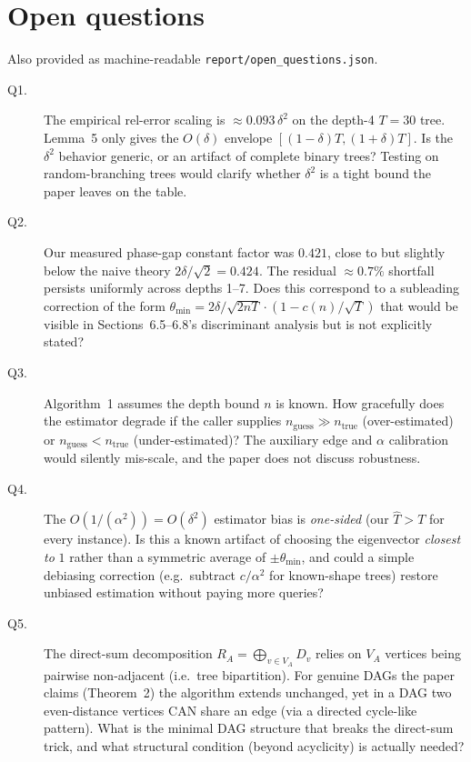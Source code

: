 \documentclass[11pt]{article}
\begin{document}
\section*{Open questions}
Also provided as machine-readable \verb|report/open_questions.json|.

\begin{description}
\item[Q1.] The empirical rel-error scaling is $\approx 0.093\,\delta^2$ on
      the depth-4 $T{=}30$ tree.  Lemma~5 only gives the $O(\delta)$ envelope
      $[(1-\delta)T, (1+\delta)T]$.  Is the $\delta^2$ behavior generic, or
      an artifact of complete binary trees?  Testing on
      random-branching trees would clarify whether $\delta^2$ is a tight bound
      the paper leaves on the table.
\item[Q2.] Our measured phase-gap constant factor was $0.421$, close to but
      slightly below the naive theory $2\delta/\sqrt{2} = 0.424$.  The
      residual $\approx 0.7\%$ shortfall persists uniformly across depths
      1--7.  Does this correspond to a subleading correction of the form
      $\theta_{\min} = 2\delta/\sqrt{2nT} \cdot (1 - c(n)/\sqrt{T})$ that
      would be visible in Sections~6.5--6.8's discriminant analysis but is
      not explicitly stated?
\item[Q3.] Algorithm~1 assumes the depth bound $n$ is known.  How gracefully
      does the estimator degrade if the caller supplies $n_{\text{guess}} \gg
      n_{\text{true}}$ (over-estimated) or $n_{\text{guess}} <
      n_{\text{true}}$ (under-estimated)?  The auxiliary edge and $\alpha$
      calibration would silently mis-scale, and the paper does not discuss
      robustness.
\item[Q4.] The $O(1/(\alpha^2)) = O(\delta^2)$ estimator bias is
      \emph{one-sided} (our $\hat T > T$ for every instance).  Is this a
      known artifact of choosing the eigenvector \emph{closest to} $1$
      rather than a symmetric average of $\pm\theta_{\min}$, and could a
      simple debiasing correction (e.g.\ subtract $c/\alpha^2$ for
      known-shape trees) restore unbiased estimation without paying more
      queries?
\item[Q5.] The direct-sum decomposition $R_A = \bigoplus_{v \in V_A} D_v$
      relies on $V_A$ vertices being pairwise non-adjacent (i.e.\ tree
      bipartition).  For genuine DAGs the paper claims (Theorem~2) the
      algorithm extends unchanged, yet in a DAG two even-distance vertices
      CAN share an edge (via a directed cycle-like pattern).  What is the
      minimal DAG structure that breaks the direct-sum trick, and what
      structural condition (beyond acyclicity) is actually needed?
\end{description}
\end{document}
